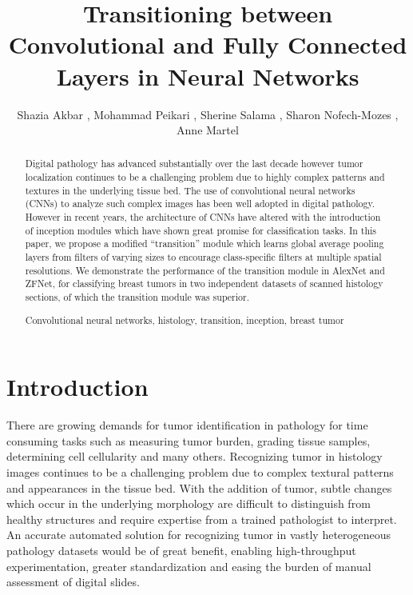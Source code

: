 \documentclass[runningheads,a4paper]{llncs}
\def\etal{\emph{et al. }}
\newcommand{\keywords}[1]{\par\addvspace\baselineskip
\noindent\keywordname\enspace\ignorespaces#1}
\begin{document}
\mainmatter  %

\title{Transitioning between Convolutional and Fully Connected Layers in Neural Networks}


\author{Shazia Akbar , Mohammad Peikari , Sherine Salama , Sharon Nofech-Mozes , Anne Martel }

\authorrunning{Akbar \etal}



\tocauthor{Akbar \etal}
\maketitle


\begin{abstract}
Digital pathology has advanced substantially over the last decade however tumor localization continues to be a challenging problem due to highly complex patterns and textures in the underlying tissue bed. The use of convolutional neural networks (CNNs) to analyze such complex images has been well adopted in digital pathology. However in recent years, the architecture of CNNs have altered with the introduction of inception modules which have shown great promise for classification tasks. In this paper, we propose a modified ``transition'' module which learns global average pooling layers from filters of varying sizes to encourage class-specific filters at multiple spatial resolutions. We demonstrate the performance of the transition module in AlexNet and ZFNet, for classifying breast tumors in two independent datasets of scanned histology sections, of which the transition module was superior.

\keywords{Convolutional neural networks, histology, transition, inception, breast tumor}
\end{abstract}

\section{Introduction}
There are growing demands for tumor identification in pathology for time consuming tasks such as measuring tumor burden, grading tissue samples, determining cell cellularity and many others. Recognizing tumor in histology images continues to be a challenging problem due to complex textural patterns and appearances in the tissue bed. With the addition of tumor, subtle changes which occur in the underlying morphology are difficult to distinguish from healthy structures and require expertise from a trained pathologist to interpret. An accurate automated solution for recognizing tumor in vastly heterogeneous pathology datasets would be of great benefit, enabling high-throughput experimentation, greater standardization and easing the burden of manual assessment of digital slides.
\end{document}
